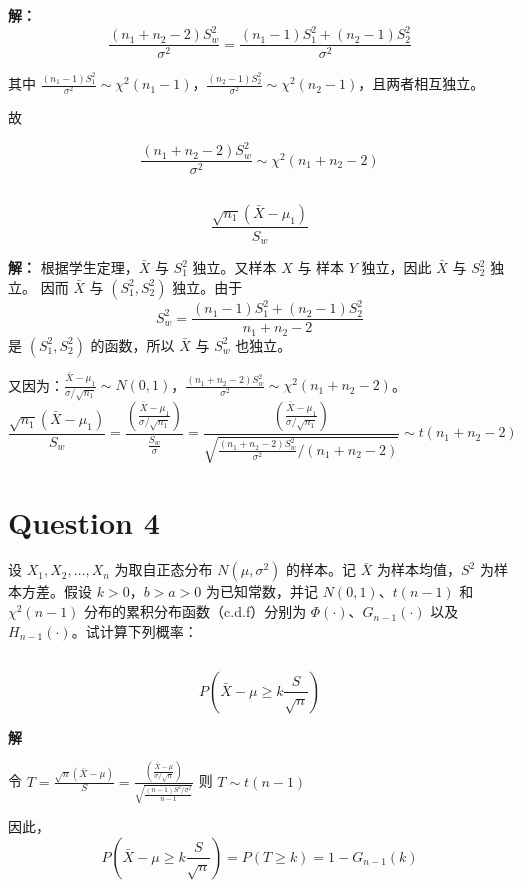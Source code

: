 \documentclass[12pt,a4paper]{article}
\begin{document}
\begin{answerbox}
  \textbf{解：}
  $$
  \frac{(n_1+n_2-2)S_w^2}{\sigma^2} = \frac{(n_1-1)S_1^2+(n_2-1)S_2^2}{\sigma^2}
  $$

  其中 $\frac{(n_1-1)S_1^2}{\sigma^2} \sim \chi^2(n_1-1)$，$\frac{(n_2-1)S_2^2}{\sigma^2} \sim \chi^2(n_2-1)$，且两者相互独立。

  故

  $$
  \frac{(n_1+n_2-2)S_w^2}{\sigma^2}  \sim \chi^2(n_1+n_2-2)
  $$
\end{answerbox}

\subsection{}
    \[
        \frac{\sqrt{n_1}(\bar{X}-\mu_1)}{S_w}
    \]

\begin{answerbox}
  \textbf{解：}
    根据学生定理，$\bar{X}$ 与 $S_1^2$ 独立。又样本 $X$ 与 样本 $Y$ 独立，因此 $\bar{X}$ 与 $S_2^2$ 独立。
    因而 $\bar{X}$ 与 $(S_1^2,S_2^2)$ 独立。由于
    $$
    S_w^2=\frac{(n_1-1)S_1^2+(n_2-1)S_2^2}{n_1+n_2-2}
    $$
    是 $(S_1^2,S_2^2)$ 的函数，所以 $\bar{X}$ 与 $S_w^2$ 也独立。

    又因为：$\frac{\bar{X}-\mu_1}{\sigma/\sqrt{n_1}} \sim N(0,1)$，$\frac{(n_1+n_2-2)S_w^2}{\sigma^2} \sim \chi^2(n_1+n_2-2)$。
  $$
  \frac{\sqrt{n_1}(\bar{X}-\mu_1)}{S_w} = \frac{\left(\frac{\bar{X}-\mu_1}{\sigma/\sqrt{n_1}}\right)}{\frac{S_w}{\sigma}} = \frac{\left(\frac{\bar{X}-\mu_1}{\sigma/\sqrt{n_1}}\right)}{\sqrt{\frac{(n_1+n_2-2)S_w^2}{\sigma^2}/(n_1+n_2-2)}} \sim t(n_1+n_2-2)
  $$
\end{answerbox}

\section{Question 4}

设 $X_1,X_2,\ldots,X_n$ 为取自正态分布 $N(\mu,\sigma^2)$ 的样本。记 $\bar{X}$ 为样本均值，$S^2$ 为样本方差。假设 $k>0$，$b>a>0$ 为已知常数，并记 $N(0,1)$、$t(n-1)$ 和 $\chi^2(n-1)$ 分布的累积分布函数（c.d.f）分别为 $\Phi(\cdot)$、$G_{n-1}(\cdot)$ 以及 $H_{n-1}(\cdot)$。试计算下列概率：

\subsection{}
  \[
      P\!\left(\bar{X}-\mu \ge k\frac{S}{\sqrt{n}}\right)
  \]

\begin{answerbox}
\textbf{解}  

令 $T = \frac{\sqrt{n}(\bar{X}-\mu)}{S} = \frac{\left(\frac{\bar{X}-\mu}{\sigma/\sqrt{n}}\right)}{\sqrt{\frac{(n-1)S^2/\sigma^2}{n-1}}}$
  则 $T \sim t(n-1)$

  因此，$$
  P\!\left(\bar{X}-\mu \ge k\frac{S}{\sqrt{n}}\right) = P\!\left(T \ge k\right) = 1 - G_{n-1}(k)
  $$
  
\end{answerbox}
\end{document}
